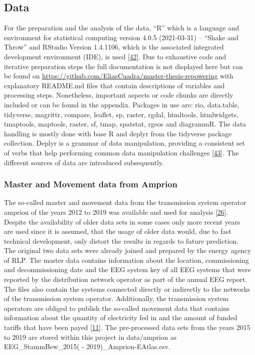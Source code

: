 \documentclass[a4paper,11pt]{article}
\begin{document}
\hypertarget{data}{%
\subsection{Data}\label{data}}

For the preparation and the analysis of the data, ``R'' which is a language and environment for statistical computing version 4.0.5 (2021-03-31) -- ``Shake and Throw'' and RStudio Version 1.4.1106, which is the associated integrated development environment (IDE), is used {[}\protect\hyperlink{ref-R}{42}{]}. Due to exhaustive code and iterative preparation steps the full documentation is not displayed here but can be found on \url{https://github.com/EliasCuadra/master-thesis-repowering} with explanatory README.md files that contain descriptions of variables and processing steps. Nonetheless, important aspects or code chunks are directly included or can be found in the appendix. Packages in use are: rio, data.table, tidyverse, magrittr, compare, leaflet, sp, raster, rgdal, htmltools, htmlwidgets, tmaptools, maptools, raster, sf, tmap, spatstat, rgeos and diagrammR. The data handling is mostly done with base R and deplyr from the tidyverse package collection. Deplyr is a grammar of data manipulation, providing a consistent set of verbs that help performing common data manipulation challenges {[}\protect\hyperlink{ref-HadleyWickham.2021}{43}{]}. The different sources of data are introduced subsequently.

\hypertarget{master-and-movement-data-from-amprion}{%
\subsubsection{Master and Movement data from Amprion}\label{master-and-movement-data-from-amprion}}

The so-called master and movement data from the transmission system operator amprion of the years 2012 to 2019 was available and used for analysis {[}\protect\hyperlink{ref-EnergieagenturRheinlandPfalz.2019}{26}{]}. Despite the availability of older data sets in some cases only more recent years are used since it is assumed, that the usage of older data would, due to fast technical development, only distort the results in regards to future prediction. The original two data sets were already joined and prepared by the energy agency of RLP. The master data contains information about the location, commissioning and decommissioning date and the EEG system key of all EEG systems that were reported by the distribution network operator as part of the annual EEG report. The files also contain the systems connected directly or indirectly to the networks of the transmission system operator. Additionally, the transmission system operators are obliged to publish the so-called movement data that contains information about the quantity of electricity fed in and the amount of funded tariffs that have been payed {[}\protect\hyperlink{ref-AmprionGmbH.2019}{11}{]}. The pre-processed data sets from the years 2015 to 2019 are stored within this project in data/amprion as EEG\_StammBew\_2015( - 2019)\_Amprion-EAtlas.csv.
\end{document}
